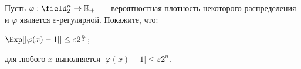 Пусть $\varphi: \field_2^n \to \mathbb{R}_+$~--- вероятностная плотность некоторого распределения и
$\varphi$ является $\varepsilon$-регулярной. Покажите, что:
\begin{enumcyr}
    \item $\Exp[|\varphi(x) - 1|] \le \varepsilon 2^{\frac{n}{2}}$;
    \item для любого $x$ выполняется $|\varphi(x) - 1| \le \varepsilon 2^{n}$.
\end{enumcyr}